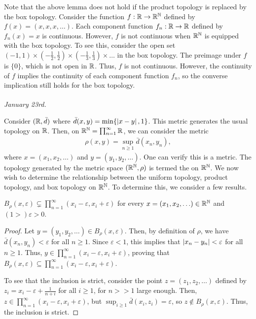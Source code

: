 Note that the above lemma does not hold if the product topology is replaced by the box topology. Consider the function $f : \mathbb{R} \to \mathbb{R}^{\mathbb{N}}$ defined by $f(x) = (x,x,x,\ldots)$. Each component function $f_{n} : \mathbb{R} \to \mathbb{R}$ defined by $f_{n}(x) = x$ is continuous. However, $f$ is not continuous when $\mathbb{R}^{\mathbb{N}}$ is equipped with the box topology. To see this, consider the open set $(-1,1) \times (-\frac{1}{2}, \frac{1}{2}) \times (-\frac{1}{3}, \frac{1}{3}) \times \ldots$ in the box topology. The preimage under $f$ is $\{0\}$, which is not open in $\mathbb{R}$. Thus, $f$ is not continuous. However, the continuity of $f$ implies the continuity of each component function $f_{n}$, so the converse implication still holds for the box topology.
\\ \\
\textit{January 23rd.}

Consider $(\mathbb{R},\bar{d})$ where $\bar{d}(x,y) = \min\{\left| x-y \right|, 1\}$. This metric generates the usual topology on $\mathbb{R}$. Then, on $\mathbb{R}^{\mathbb{N}} = \prod_{n=1}^{\infty} \mathbb{R}$, we can consider the metric
\begin{align}
    \rho(x,y) = \sup_{n \geq 1} \bar{d}(x_{n}, y_{n}),
\end{align}
where $x = (x_{1}, x_{2}, \ldots)$ and $y = (y_{1}, y_{2}, \ldots)$. One can verify this is a metric. The topology generated by the metric space $(\mathbb{R}^{\mathbb{N}},\rho)$ is termed the  on $\mathbb{R}^{\mathbb{N}}$. We now wish to determine the relationship between the uniform topology, product topology, and box topology on $\mathbb{R}^{\mathbb{N}}$. To determine this, we consider a few results.

\begin{lemma}
    $B_{\rho}(x,\varepsilon) \subsetneq \prod_{n=1}^{\infty} (x_{i}-\varepsilon,x_{i}+\varepsilon)$ for every $x = (x_{1}, x_{2}, \ldots) \in \mathbb{R}^{\mathbb{N}}$ and $(1 > )\varepsilon > 0$.
\end{lemma}
\begin{proof}
    Let $y = (y_{1}, y_{2}, \ldots) \in B_{\rho}(x,\varepsilon)$. Then, by definition of $\rho$, we have $\bar{d}(x_{n}, y_{n}) < \varepsilon$ for all $n \geq 1$. Since $\varepsilon < 1$, this implies that $\left| x_{n} - y_{n} \right| < \varepsilon$ for all $n \geq 1$. Thus, $y \in \prod_{n=1}^{\infty} (x_{i}-\varepsilon,x_{i}+\varepsilon)$, proving that $B_{\rho}(x,\varepsilon) \subseteq \prod_{n=1}^{\infty} (x_{i}-\varepsilon,x_{i}+\varepsilon)$.

    To see that the inclusion is strict, consider the point $z = (z_{1}, z_{2}, \ldots)$ defined by $z_{i} = x_{i} - \varepsilon + \frac{1}{n+i}$ for all $i \geq 1$, for $n >> 1$ large enough. Then, $z \in \prod_{n=1}^{\infty} (x_{i}-\varepsilon,x_{i}+\varepsilon)$, but $\sup_{i \geq 1} \bar{d}(x_{i}, z_{i}) = \varepsilon$, so $z \notin B_{\rho}(x,\varepsilon)$. Thus, the inclusion is strict.
\end{proof}

